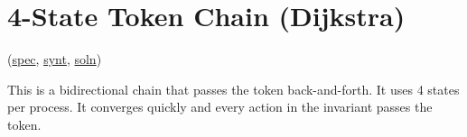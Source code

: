 \section{4-State Token Chain (Dijkstra)}
\label{sec:TokenChainDijkstra}

(\href{\examplespec/TokenChainDijkstra.prot}{spec},
\href{\examplesynt/TokenChainDijkstra.prot}{synt},
\href{\examplesoln/TokenChainDijkstra.prot}{soln})

This is a bidirectional chain that passes the token back-and-forth.
It uses 4 states per process.
It converges quickly and every action in the invariant passes the token.




